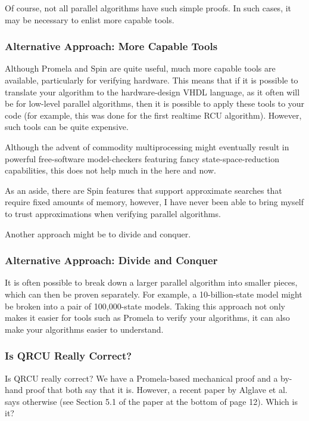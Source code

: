 Of course, not all parallel algorithms have such simple proofs.
In such cases, it may be necessary to enlist more capable tools.

\subsubsection{Alternative Approach: More Capable Tools}
\label{sec:formal:Alternative Approach: More Capable Tools}

Although Promela and Spin are quite useful,
much more capable tools are available, particularly for verifying
hardware.
This means that if it is possible to translate your algorithm
to the hardware-design VHDL language, as it often will be for
low-level parallel algorithms, then it is possible to apply these
tools to your code (for example, this was done for the first
realtime RCU algorithm).
However, such tools can be quite expensive.

Although the advent of commodity multiprocessing
might eventually result in powerful free-software model-checkers
featuring fancy state-space-reduction capabilities,
this does not help much in the here and now.

As an aside, there are Spin features that support approximate searches
that require fixed amounts of memory, however, I have never been able
to bring myself to trust approximations when verifying parallel
algorithms.

Another approach might be to divide and conquer.

\subsubsection{Alternative Approach: Divide and Conquer}
\label{sec:formal:Alternative Approach: Divide and Conquer}

It is often possible to break down a larger parallel algorithm into
smaller pieces, which can then be proven separately.
For example, a 10-billion-state model might be broken into a pair
of 100,000-state models.
Taking this approach not only makes it easier for tools such as
Promela to verify your algorithms, it can also make your algorithms
easier to understand.

\subsubsection{Is QRCU Really Correct?}
\label{sec:formal:Is QRCU Really Correct?}

Is QRCU really correct?
We have a Promela-based mechanical proof and a by-hand proof that both
say that it is.
However, a recent paper by Alglave et al.~\cite{JadeAlglave2013-cav}
says otherwise (see Section 5.1 of the paper at the bottom of page 12).
Which is it?

